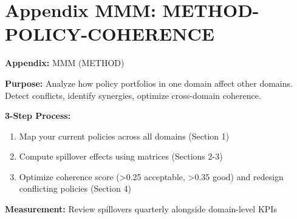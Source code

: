 %
%
%
%
%
%

\newpage
\section*{Appendix MMM: METHOD-POLICY-COHERENCE}
\label{app:method-policy-coherence}


\begin{tcolorbox}[colback=blue!5!white, colframe=blue!75!black, title=Quick Reference]
\textbf{Appendix:} MMM (METHOD)

\small
\textbf{Purpose:} Analyze how policy portfolios in one domain affect other domains. Detect conflicts, identify synergies, optimize cross-domain coherence.

\textbf{3-Step Process:}
\begin{enumerate}[nosep]
\item Map your current policies across all domains (Section 1)
\item Compute spillover effects using matrices (Sections 2-3)
\item Optimize coherence score (>0.25 acceptable, >0.35 good) and redesign conflicting policies (Section 4)
\end{enumerate}

\textbf{Measurement:} Review spillovers quarterly alongside domain-level KPIs
\end{tcolorbox}



